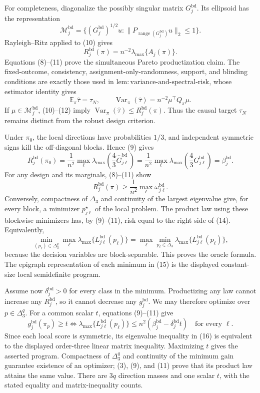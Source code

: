 For completeness, diagonalize the possibly singular matrix \(G_j^{\mathrm{bd}}\). Its ellipsoid has the representation
\[
\mathcal M_j^{\mathrm{bd}}
=\{(G_j^{\mathrm{bd}})^{1/2}u:
\|P_{\operatorname{range}(G_j^{\mathrm{bd}})}u\|_2\le1\}.
\tag{10}
\]
Rayleigh--Ritz applied to (10) gives
\[
R_j^{\mathrm{bd}}(\pi)
=n^{-2}\lambda_{\max}\{A_j(\pi)\}.
\tag{11}
\]
Equations (8)--(11) prove the simultaneous Pareto productization claim. The fixed-outcome, consistency, assignment-only-randomness, support, and blinding conditions are exactly those used in \(\mathrm{lem:variance\text{-}and\text{-}spectral\text{-}risk}\), whose estimator identity gives
\[
\mathbb E_\pi\widehat\tau=\tau_N,
\qquad
\operatorname{Var}_\pi(\widehat\tau)=n^{-2}\mu^\top Q_\pi\mu.
\tag{12}
\]
If \(\mu\in\mathcal M_j^{\mathrm{bd}}\), (10)--(12) imply \(\operatorname{Var}_\pi(\widehat\tau)\le R_j^{\mathrm{bd}}(\pi)\). Thus the causal target \(\tau_N\) remains distinct from the robust design criterion.

Under \(\pi_0\), the local directions have probabilities \(1/3\), and independent symmetric signs kill the off-diagonal blocks. Hence (9) gives
\[
R_j^{\mathrm{bd}}(\pi_0)
=\frac1{n^2}\max_\ell
\lambda_{\max}\!\left(\frac43\widehat G^{\mathrm{bd}}_{j\ell}\right)
=\frac1{n^2}\max_\ell
\lambda_{\max}\!\left(\frac43G^{\mathrm{bd}}_{j\ell}\right)
=\beta_j^{\mathrm{bd}}.
\tag{13}
\]
For any design and its marginals, (8)--(11) show
\[
R_j^{\mathrm{bd}}(\pi)
\ge\frac1{n^2}\max_\ell\omega^{\mathrm{bd}}_{j\ell}.
\tag{14}
\]
Conversely, compactness of \(\Delta_3\) and continuity of the largest eigenvalue give, for every block, a minimizer \(p_{j\ell}^\star\) of the local problem. The product law using these blockwise minimizers has, by (9)--(11), risk equal to the right side of (14). Equivalently,
\[
\min_{(p_\ell)\in\Delta_3^q}
\max_\ell\lambda_{\max}\{L^{\mathrm{bd}}_{j\ell}(p_\ell)\}
=\max_\ell\min_{p_\ell\in\Delta_3}
\lambda_{\max}\{L^{\mathrm{bd}}_{j\ell}(p_\ell)\},
\tag{15}
\]
because the decision variables are block-separable. This proves the oracle formula. The epigraph representation of each minimum in (15) is the displayed constant-size local semidefinite program.

Assume now \(\delta_j^{\mathrm{bd}}>0\) for every class in the minimum. Productizing any law cannot increase any \(R_j^{\mathrm{bd}}\), so it cannot decrease any \(g_j^{\mathrm{bd}}\). We may therefore optimize over \(p\in\Delta_3^q\). For a common scalar \(t\), equations (9)--(11) give
\[
g_j^{\mathrm{bd}}(\pi_p)\ge t
\iff
\lambda_{\max}\{L^{\mathrm{bd}}_{j\ell}(p_\ell)\}
\le n^2(\beta_j^{\mathrm{bd}}-\delta_j^{\mathrm{bd}}t)
\quad\text{for every }\ell.
\tag{16}
\]
Since each local score is symmetric, its eigenvalue inequality in (16) is equivalent to the displayed order-three linear matrix inequality. Maximizing \(t\) gives the asserted program. Compactness of \(\Delta_3^q\) and continuity of the minimum gain guarantee existence of an optimizer; (3), (9), and (11) prove that its product law attains the same value. There are \(3q\) direction masses and one scalar \(t\), with the stated equality and matrix-inequality counts.

